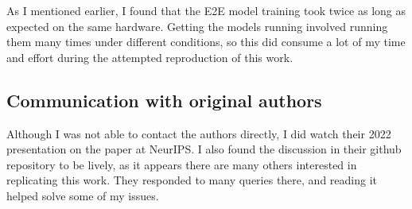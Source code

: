 As I mentioned earlier, I found that the E2E model training took twice as long as expected on the same hardware. Getting the models running involved running them many times under different conditions, so this did consume a lot of my time and effort during the attempted reproduction of this work.

\subsection{Communication with original authors}

Although I was not able to contact the authors directly, I did watch their 2022 presentation on the paper at NeurIPS. I also found the discussion in their github repository to be lively, as it appears there are many others interested in replicating this work. They responded to many queries there, and reading it helped solve some of my issues.
